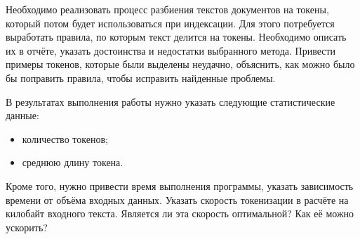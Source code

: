 
Необходимо реализовать процесс разбиения текстов документов на токены, который
потом будет использоваться при индексации. Для этого потребуется выработать
правила, по которым текст делится на токены. Необходимо описать их в отчёте,
указать достоинства и недостатки выбранного метода. Привести примеры токенов,
которые были выделены неудачно, объяснить, как можно было бы поправить правила,
чтобы исправить найденные проблемы.

В результатах выполнения работы нужно указать следующие статистические данные:

\begin{itemize}
    \item количество токенов;
    \item среднюю длину токена.
\end{itemize}

Кроме того, нужно привести время выполнения программы, указать зависимость
времени от объёма входных данных. Указать скорость токенизации в расчёте на
килобайт входного текста. Является ли эта скорость оптимальной? Как её можно
ускорить?

\pagebreak
